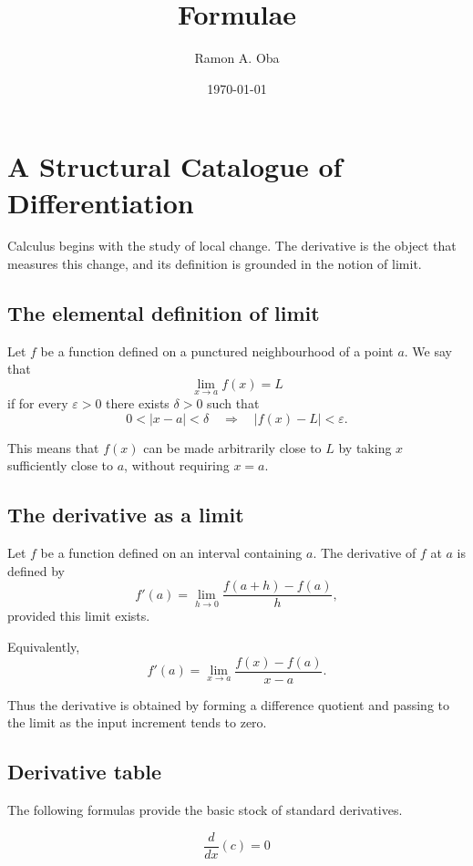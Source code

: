 \documentclass{article}
\begin{document}
	
	\title{Formulae}
	\author{Ramon A. Oba}
	\date{\today}
	
	\maketitle
	\section{A Structural Catalogue of Differentiation}
	
	Calculus begins with the study of local change.  
	The derivative is the object that measures this change, and its definition is grounded in the notion of limit.
	
	\subsection{The elemental definition of limit}
	
	Let \(f\) be a function defined on a punctured neighbourhood of a point \(a\).  
	We say that
	\[
	\lim_{x\to a} f(x)=L
	\]
	if for every \(\varepsilon>0\) there exists \(\delta>0\) such that
	\[
	0<|x-a|<\delta
	\quad \Longrightarrow \quad
	|f(x)-L|<\varepsilon.
	\]
	
	This means that \(f(x)\) can be made arbitrarily close to \(L\) by taking \(x\) sufficiently close to \(a\), without requiring \(x=a\).
	
	\subsection{The derivative as a limit}
	
	Let \(f\) be a function defined on an interval containing \(a\).  
	The derivative of \(f\) at \(a\) is defined by
	\[
	f'(a)
	=
	\lim_{h\to 0}\frac{f(a+h)-f(a)}{h},
	\]
	provided this limit exists.
	
	Equivalently,
	\[
	f'(a)
	=
	\lim_{x\to a}\frac{f(x)-f(a)}{x-a}.
	\]
	
	Thus the derivative is obtained by forming a difference quotient and passing to the limit as the input increment tends to zero.
	
	\subsection{Derivative table}
	
	The following formulas provide the basic stock of standard derivatives.
	
	\[
	\frac{d}{dx}(c)=0
	\]
	
\end{document}
